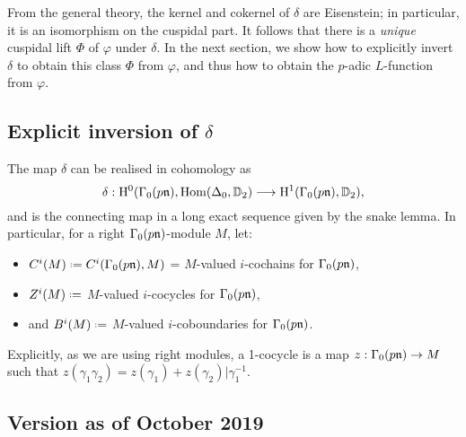 \documentclass[a4paper,10pt]{article}
\numberwithin{equation}{section}
\begin{document}
From the general theory, the kernel and cokernel of $\delta$ are Eisenstein; in particular, it is an isomorphism on the cuspidal part. It follows that there is a \emph{unique} cuspidal lift $\Phi$ of $\varphi$ under $\delta$. In the next section, we show how to explicitly invert $\delta$ to obtain this class $\Phi$ from $\varphi$, and thus how to obtain the $p$-adic $L$-function from $\varphi$.

\subsection{Explicit inversion of $\delta$}
The map $\delta$ can be realised in cohomology as 
\[
\delta : \mathrm{H}^0(\Gamma_0(p\mathfrak{n}),\mathrm{Hom}(\Delta_0,\mathbb{D}_2) \longrightarrow \mathrm{H}^1(\Gamma_0(p\mathfrak{n}),\mathbb{D}_2),
\]
and is the connecting map in a long exact sequence given by the snake lemma. In particular, for a right $\Gamma_0(p\mathfrak{n})$-module $M$, let:
\begin{itemize}
	\item $C^i(M) \defeq C^i(\Gamma_0(p\n),M)$ = $M$-valued $i$-cochains for $\Gamma_0(p\mathfrak{n})$,
	\item $Z^i(M) \defeq$ $M$-valued $i$-cocycles for $\Gamma_0(p\mathfrak{n})$,
	\item and $B^i(M) \defeq$ $M$-valued $i$-coboundaries for $\Gamma_0(p\mathfrak{n})$. 
\end{itemize}
Explicitly, as we are using right modules, a 1-cocycle is a map $z : \Gamma_0(p\mathfrak{n}) \to M$ such that $z(\gamma_1\gamma_2) = z(\gamma_1) + z(\gamma_2)|\gamma_1^{-1}$.

\subsection{Version as of October 2019}
\end{document}
